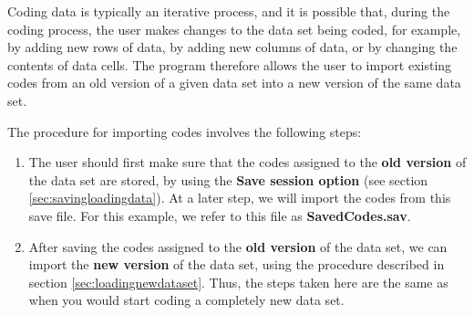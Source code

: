 \documentclass{memoir}
\begin{document}
Coding data is typically an iterative process, and it is possible that, during the coding process, the user makes changes to the data set being coded, for example, by adding new rows of data, by adding new columns of data, or by changing the contents of data cells. The program therefore allows the user to import existing codes from an old version of a given data set into a new version of the same data set. 


The procedure for importing codes involves the following steps:
\begin{enumerate}
\item{The user should first make sure that the codes assigned to the \textbf{old version} of the data set are stored, by using the \textbf{Save session option} (see section \ref{sec:savingloadingdata}). At a later step, we will import the codes from this save file. For this example, we refer to this file as \textbf{Saved\textunderscore Codes.sav}.}
\item{After saving the codes assigned to the \textbf{old version} of the data set, we can import the \textbf{new version} of the data set, using the procedure described in section \ref{sec:loadingnewdataset}. Thus, the steps taken here are the same as when you would start coding a completely new data set.}

\end{enumerate}
\end{document}
